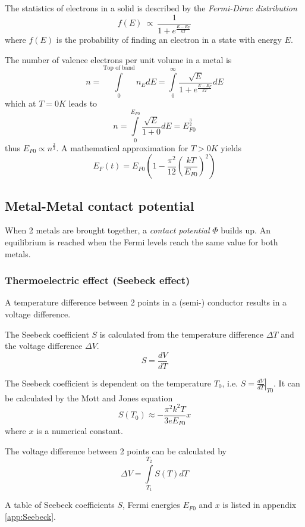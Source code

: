 The statistics of electrons in a solid is described by the \emph{Fermi-Dirac distribution}
\begin{equation}
    f(E) \:\propto\: \frac{1}{1 + e^{\frac{E-E_F}{kT}}}
\end{equation}
where $f(E)$ is the probability of finding an electron in a state with energy $E$.


The number of valence electrons per unit volume in a metal is
\begin{equation}
    n = \int\limits_{0}^{\text{Top of band}} n_E dE = \int\limits_{0}^{\infty} \frac{\sqrt{E}}{1 + e^{\frac{E-E_F}{kT}}} dE
\end{equation}
which at $T=0K$ leads to
\begin{equation}
    n = \int\limits_{0}^{E_{F0}} \frac{\sqrt{E}}{1+0} dE = E_{F0}^{\frac{3}{2}}
\end{equation}
thus $E_{F0} \propto n^{\frac{2}{3}}$.
A mathematical approximation for $T > 0K$ yields
\begin{equation}
    E_F(t) = E_{F0} \left( 1 - \frac{\pi^2}{12} \left( \frac{kT}{E_{F0}} \right)^2 \right)
\end{equation}

\subsection{Metal-Metal contact potential}
When 2 metals are brought together, a \emph{contact potential} $\Phi$ builds up.
An equilibrium is reached when the Fermi levels reach the same value for both metals.

\subsubsection{Thermoelectric effect (Seebeck effect)}
A temperature difference between 2 points in a (semi-) conductor results in a voltage difference.

The Seebeck coefficient $S$ is calculated from the temperature difference $\Delta T$ and the voltage difference $\Delta V$.
\begin{equation}
    S = \frac{dV}{dT}
\end{equation}

The Seebeck coefficient is dependent on the temperature $T_0$, i.e. $S = \left.\frac{dV}{dT}\right|_{T0}$.
It can be calculated by the Mott and Jones equation
\begin{equation}
    S(T_0) \approx -\frac{\pi^2 k^2 T}{3 e E_{F0}} x
\end{equation}
where $x$ is a numerical constant.

The voltage difference between 2 points can be calculated by
\begin{equation}
    \Delta V = \int\limits_{T_1}^{T_2} S(T) dT
\end{equation}

A table of Seebeck coefficients $S$, Fermi energies $E_{F0}$ and $x$ is listed in appendix \ref{app:Seebeck}.


